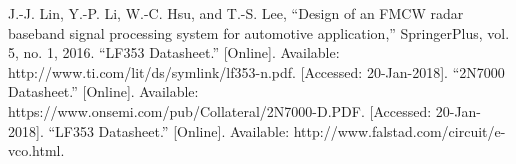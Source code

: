 \documentclass[paper]{IEEEtran}
\begin{document}
\begin{thebibliography}{00}
 J.-J. Lin, Y.-P. Li, W.-C. Hsu, and T.-S. Lee, “Design of an FMCW radar baseband signal processing system for automotive application,” SpringerPlus, vol. 5, no. 1, 2016.	
 “LF353 Datasheet.” [Online]. Available: http://www.ti.com/lit/ds/symlink/lf353-n.pdf. [Accessed: 20-Jan-2018].
 “2N7000 Datasheet.” [Online]. Available: https://www.onsemi.com/pub/Collateral/2N7000-D.PDF. [Accessed: 20-Jan-2018].
 “LF353 Datasheet.” [Online]. Available: http://www.falstad.com/circuit/e-vco.html.

\end{thebibliography}
\end{document}
